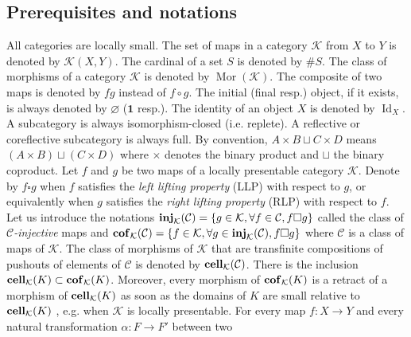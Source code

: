 \documentclass[a4paper,12pt]{amsart}
\begin{document}
\subsection{Prerequisites and notations}

All categories are locally small. The set of maps in a category ${\mathcal{K}}$
from $X$ to $Y$ is denoted by ${\mathcal{K}}(X,Y)$. The cardinal of a set $S$ is
denoted by $\# S$.  The class of morphisms of a category ${\mathcal{K}}$ is
denoted by $\operatorname{Mor}({\mathcal{K}})$. The composite of two maps is denoted by $fg$
instead of $f \circ g$. The initial (final resp.)  object, if it
exists, is always denoted by $\varnothing$ ($\mathbf{1}$ resp.). The
identity of an object $X$ is denoted by $\operatorname{Id}_X$.  A subcategory is
always isomorphism-closed (i.e. replete).  A reflective or
coreflective subcategory is always full. By convention, $A \times B \sqcup
C \times D$ means $(A \times B) \sqcup (C \times D)$ where $\times$ denotes the binary
product and $\sqcup$ the binary coproduct.  Let $f$ and $g$ be two
maps of a locally presentable category ${\mathcal{K}}$. Denote by $f\square g$
when $f$ satisfies the \emph{left lifting property} (LLP) with respect
to $g$, or equivalently when $g$ satisfies the \emph{right lifting
  property} (RLP) with respect to $f$. Let us introduce the notations
$\operatorname{{{\rm{\mathbf{{inj}}}}}}_{\mathcal{K}}({\mathcal{C}}) = \{g \in {\mathcal{K}}, \forall f \in {\mathcal{C}}, f\square g\}$ called the
class of \emph{${\mathcal{C}}$-injective} maps and $\operatorname{{{\rm{\mathbf{{cof}}}}}}_{\mathcal{K}}({\mathcal{C}}) = \{f \in {\mathcal{K}},
\forall g\in \operatorname{{{\rm{\mathbf{{inj}}}}}}_{\mathcal{K}}({\mathcal{C}}), f\square g\}$ where ${\mathcal{C}}$ is a class of maps
of ${\mathcal{K}}$. The class of morphisms of ${\mathcal{K}}$ that are transfinite
compositions of pushouts of elements of ${\mathcal{C}}$ is denoted by
$\operatorname{{{\rm{\mathbf{{cell}}}}}}_{\mathcal{K}}({\mathcal{C}})$. There is the inclusion $\operatorname{{{\rm{\mathbf{{cell}}}}}}_{\mathcal{K}}(K)\subset
\operatorname{{{\rm{\mathbf{{cof}}}}}}_{\mathcal{K}}(K)$. Moreover, every morphism of $\operatorname{{{\rm{\mathbf{{cof}}}}}}_{\mathcal{K}}(K)$ is a retract of
a morphism of $\operatorname{{{\rm{\mathbf{{cell}}}}}}_{\mathcal{K}}(K)$ as soon as the domains of $K$ are small
relative to $\operatorname{{{\rm{\mathbf{{cell}}}}}}_{\mathcal{K}}(K)$ \cite[Corollary~2.1.15]{MR99h:55031},
e.g. when ${\mathcal{K}}$ is locally presentable. For every map $f:X \to Y$ and
every natural transformation $\alpha : F \to F'$ between two
\end{document}
